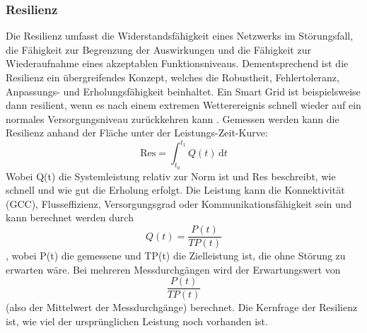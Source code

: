 \subsubsection{Resilienz}
Die Resilienz umfasst die Widerstandsfähigkeit eines Netzwerks im Störungsfall, die Fähigkeit zur Begrenzung der Auswirkungen und die Fähigkeit zur Wiederaufnahme eines akzeptablen Funktionsniveaus. Dementsprechend ist die Resilienz ein übergreifendes Konzept, welches die Robustheit, Fehlertoleranz, Anpassungs- und Erholungsfähigkeit beinhaltet. Ein Smart Grid ist beispielsweise dann resilient, wenn es nach einem extremen Wetterereignis schnell wieder auf ein normales Versorgungsniveau zurückkehren kann . 
Gemessen werden kann die Resilienz anhand der Fläche unter der Leistungs-Zeit-Kurve: 
\[
\mathrm{Res} = \int_{t_0}^{t_1} Q(t)\,\mathrm{d}t
\]
Wobei Q(t) die Systemleistung relativ zur Norm ist und Res beschreibt, wie schnell und wie gut die Erholung erfolgt. Die Leistung kann die Konnektivität (GCC), Flusseffizienz, Versorgungsgrad oder Kommunikationsfähigkeit sein und kann berechnet werden durch 
\[
Q(t) = \frac{P(t)}{TP(t)}
\], wobei P(t) die gemessene und TP(t) die Zielleistung ist, die ohne Störung zu erwarten wäre. 
Bei mehreren Messdurchgängen wird der Erwartungswert von 
\[
\frac{P(t)}{TP(t)}
\] (also der Mittelwert der Messdurchgänge) berechnet. Die Kernfrage der Resilienz ist, wie viel der ursprünglichen Leistung noch vorhanden ist. 
